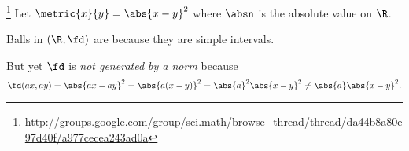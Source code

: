 {%








\begin{example}
\label{ex:d_balls_nonorm_convex}
\footnote{\url{http://groups.google.com/group/sci.math/browse_thread/thread/da44b8a80e97d40f/a977cecea243ad0a}}
Let $\metric{x}{y}=\abs{x-y}^2$ where $\absn$ is the absolute value on $\R$.
\begin{liste}
  \item Balls in $(\R,\fd)$ are  because they are simple intervals.
  \item But yet $\fd$ is \emph{not generated by a norm} because 
     \[ \fd(ax,ay) = \abs{ax-ay}^2 = \abs{a(x-y)}^2 = \abs{a}^2\abs{x-y}^2 \ne  \abs{a}\abs{x-y}^2.\]
\end{liste}
\end{example}


}
